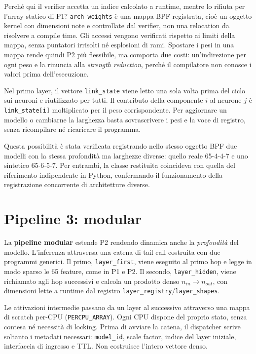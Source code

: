 \documentclass[binding=0.6cm,italian,oneside,noexaminfo]{sapthesis}
\begin{document}
Perché qui il verifier accetta un indice calcolato a runtime, mentre lo rifiuta per l'array statico di P1? \texttt{arch\_weights} è una mappa BPF registrata, cioè un oggetto kernel con dimensioni note e controllate dal verifier, non una relocation da risolvere a compile time. Gli accessi vengono verificati rispetto ai limiti della mappa, senza puntatori irrisolti né esplosioni di rami. Spostare i pesi in una mappa rende quindi P2 più flessibile, ma comporta due costi: un'indirezione per ogni peso e la rinuncia alla \emph{strength reduction}, perché il compilatore non conosce i valori prima dell'esecuzione.

Nel primo layer, il vettore \texttt{link\_state} viene letto una sola volta prima del ciclo sui neuroni e riutilizzato per tutti. Il contributo della componente $i$ al neurone $j$ è \texttt{link\_state[i]} moltiplicato per il peso corrispondente. Per aggiornare un modello o cambiarne la larghezza basta sovrascrivere i pesi e la voce di registro, senza ricompilare né ricaricare il programma.

Questa possibilità è stata verificata registrando nello stesso oggetto BPF due modelli con la stessa profondità ma larghezze diverse: quello reale 65-4-4-7 e uno sintetico 65-6-5-7. Per entrambi, la classe restituita coincideva con quella del riferimento indipendente in Python, confermando il funzionamento della registrazione concorrente di architetture diverse.

\section{Pipeline 3: modular}
\label{sec:p3}

La \textbf{pipeline modular} estende P2 rendendo dinamica anche la \emph{profondità} del modello. L'inferenza attraversa una catena di tail call costruita con due programmi generici. Il primo, \texttt{layer\_first}, viene eseguito al primo hop e legge in modo sparso le 65 feature, come in P1 e P2. Il secondo, \texttt{layer\_hidden}, viene richiamato agli hop successivi e calcola un prodotto denso $n_{in} \rightarrow n_{out}$, con dimensioni lette a runtime dal registro \texttt{layer\_registry}/\texttt{layer\_shapes}.

Le attivazioni intermedie passano da un layer al successivo attraverso una mappa di scratch per-CPU (\texttt{PERCPU\_ARRAY}). Ogni CPU dispone del proprio stato, senza contesa né necessità di locking. Prima di avviare la catena, il dispatcher scrive soltanto i metadati necessari: \texttt{model\_id}, scale factor, indice del layer iniziale, interfaccia di ingresso e TTL. Non costruisce l'intero vettore denso.
\end{document}

